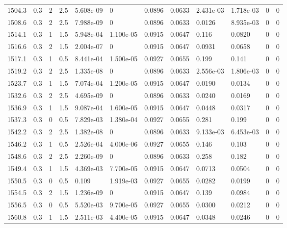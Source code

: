 \documentclass[preview]{standalone}
\begin{document}
{{{{{{{{{\begin{tabular}{L{1.2cm}C{1.2cm} C{0.3cm}C{0.5cm} C{1.4cm}C{1.4cm} C{1.4cm}C{1.4cm} C{1.6cm}C{1.6cm} C{1.6cm}C{1.6cm}}
  1504.3  &   0.3  & 2     & 2.5 &  5.608e-09  & 0  &  0.0896&   0.0633& 2.431e-03 & 1.718e-03   &  0 & 0  \\ 
  1508.6  &   0.3  & 2     & 2.5 &  7.988e-09  & 0  &  0.0896&   0.0633& 0.0126 & 8.935e-03   &  0 & 0  \\ 
  1514.1  &   0.3  & 1     & 1.5 &  5.948e-04  & 1.100e-05  &  0.0915&   0.0647& 0.116 & 0.0820   &  0 & 0  \\ 
  1516.6  &   0.3  & 2     & 1.5 &  2.004e-07  & 0  &  0.0915&   0.0647& 0.0931 & 0.0658   &  0 & 0  \\ 
  1517.1  &   0.3  & 1     & 0.5 &  8.441e-04  & 1.500e-05  &  0.0927&   0.0655& 0.199 & 0.141   &  0 & 0  \\ 
  1519.2  &   0.3  & 2     & 2.5 &  1.335e-08  & 0  &  0.0896&   0.0633& 2.556e-03 & 1.806e-03   &  0 & 0  \\ 
  1523.7  &   0.3  & 1     & 1.5 &  7.074e-04  & 1.200e-05  &  0.0915&   0.0647& 0.0190 & 0.0134   &  0 & 0  \\ 
  1532.6  &   0.3  & 2     & 2.5 &  4.695e-09  & 0  &  0.0896&   0.0633& 0.0240 & 0.0169   &  0 & 0  \\ 
  1536.9  &   0.3  & 1     & 1.5 &  9.087e-04  & 1.600e-05  &  0.0915&   0.0647& 0.0448 & 0.0317   &  0 & 0  \\ 
  1537.3  &   0.3  & 0     & 0.5 &  7.829e-03  & 1.380e-04  &  0.0927&   0.0655& 0.281 & 0.199   &  0 & 0  \\ 
  1542.2  &   0.3  & 2     & 2.5 &  1.382e-08  & 0  &  0.0896&   0.0633& 9.133e-03 & 6.453e-03   &  0 & 0  \\ 
  1546.2  &   0.3  & 1     & 0.5 &  2.526e-04  & 4.000e-06  &  0.0927&   0.0655& 0.146 & 0.103   &  0 & 0  \\ 
  1548.6  &   0.3  & 2     & 2.5 &  2.260e-09  & 0  &  0.0896&   0.0633& 0.258 & 0.182   &  0 & 0  \\ 
  1549.4  &   0.3  & 1     & 1.5 &  4.369e-03  & 7.700e-05  &  0.0915&   0.0647& 0.0713 & 0.0504   &  0 & 0  \\ 
  1550.5  &   0.3  & 0     & 0.5 &  0.109  & 1.919e-03  &  0.0927&   0.0655& 0.0282 & 0.0199   &  0 & 0  \\ 
  1554.5  &   0.3  & 2     & 1.5 &  1.236e-09  & 0  &  0.0915&   0.0647& 0.139 & 0.0984   &  0 & 0  \\ 
  1556.5  &   0.3  & 0     & 0.5 &  5.520e-03  & 9.700e-05  &  0.0927&   0.0655& 0.0300 & 0.0212   &  0 & 0  \\ 
  1560.8  &   0.3  & 1     & 1.5 &  2.511e-03  & 4.400e-05  &  0.0915&   0.0647& 0.0348 & 0.0246   &  0 & 0  \\ 

\end{tabular}}}}}}}}}}
\end{document}

